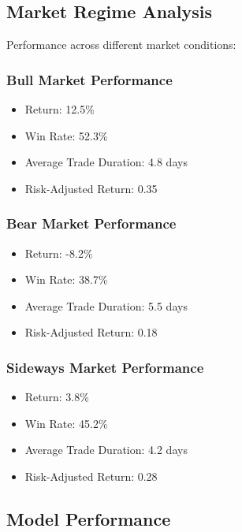 \documentclass[conference]{IEEEtran}
\begin{document}
\subsection{Market Regime Analysis}
Performance across different market conditions:

\subsubsection{Bull Market Performance}
\begin{itemize}
    \item Return: 12.5\%
    \item Win Rate: 52.3\%
    \item Average Trade Duration: 4.8 days
    \item Risk-Adjusted Return: 0.35
\end{itemize}

\subsubsection{Bear Market Performance}
\begin{itemize}
    \item Return: -8.2\%
    \item Win Rate: 38.7\%
    \item Average Trade Duration: 5.5 days
    \item Risk-Adjusted Return: 0.18
\end{itemize}

\subsubsection{Sideways Market Performance}
\begin{itemize}
    \item Return: 3.8\%
    \item Win Rate: 45.2\%
    \item Average Trade Duration: 4.2 days
    \item Risk-Adjusted Return: 0.28
\end{itemize}

\subsection{Model Performance}
\end{document}
